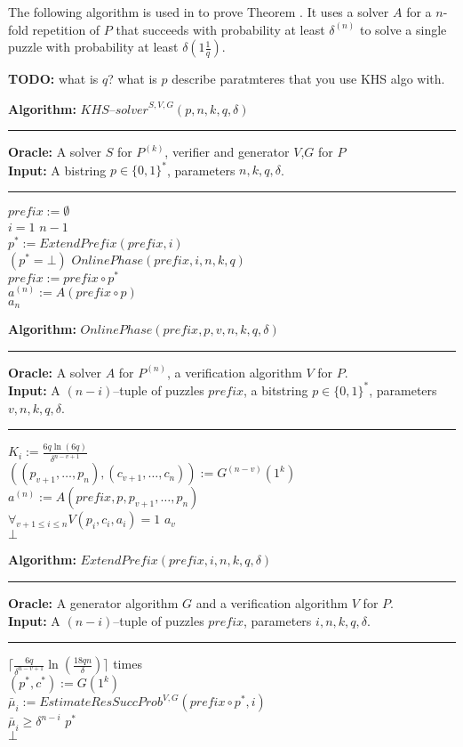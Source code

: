 \documentclass[11pt,a4paper,titlepage]{memoir}
\begin{document}
The following algorithm is used in \cite{canetti2004hardness} to prove Theorem \cite{th:wvp_chs}.
It uses a solver $A$ for a $n$-fold repetition of $P$ that succeeds with probability at least $\delta^{(n)}$
to solve a single puzzle with probability at least $\delta(1 \frac {1}{q})$.
%
\begin{todo}
  \textbf{TODO:} what is $q$? what is $p$ describe paratmteres that you use KHS algo with.
\end{todo}
%
\begin{codeblock}
  \textbf{Algorithm:} $\mathit{KHS\text{--}solver}^{S,V,G}(p, n, k, q, \delta)$
  \medskip\hrule
  \textbf{Oracle:} A solver $S$ for $P^{(k)}$, verifier and generator $V$,$G$ for $P$\\
  \textbf{Input:}  A bistring $p \in \{0,1\}^{*}$, parameters $n, k, q, \delta$.
  \medskip\hrule
  $\mathit{prefix} := \emptyset$\\
  \For $i = 1$ \To $n-1$ \Do \\
  \IndI $p^* := \mathit{ExtendPrefix(prefix, i)}$\\
  \IndI \If $(p^* = \bot)$ \Then \Return $\mathit{OnlinePhase}(prefix, i, n, k, q)$ \\
  \IndI \Else $prefix := prefix \circ p^*$\\
  $ a^{(n)} := A(prefix \circ p)$ \\
  \Return $a_n$
\end{codeblock}
%
\begin{codeblock}
  \textbf{Algorithm:} $\mathit{OnlinePhase(prefix, p, v, n, k, q, \delta)}$
  \medskip \hrule
  \textbf{Oracle:} A solver $A$ for $P^{(n)}$, a verification algorithm $V$ for $P$.\\
  \textbf{Input:} A $(n-i)$--tuple of puzzles $\mathit{prefix}$, a bitstring $p \in \{0,1\}^{*}$, parameters $v, n, k, q, \delta$.
  \medskip\hrule
  \Repeat $K_i := \frac{6q \ln (6q)}{\delta^{n-v+1}}$ \\
  \IndI $((p_{v+1}, \dotsc, p_{n}),(c_{v+1}, \dots, c_n)) := G^{(n-v)}(1^k)$\\
  \IndI $a^{(n)} := A(\mathit{prefix}, p, p_{v+1}, \dotsc, p_n)$\\
  \IndI \If $\forall_{v+1 \leq i \leq n} V(p_i, c_i, a_i) = 1$ \Then \Return $a_v$\\
  \Return $\bot$
\end{codeblock}
%
\begin{codeblock}
  \textbf{Algorithm:} $\mathit{ExtendPrefix(prefix, i, n, k, q, \delta)}$
  \medskip \hrule
  \textbf{Oracle:}  A generator algorithm $G$ and a verification algorithm $V$ for $P$.\\
  \textbf{Input:} A $(n-i)$--tuple of puzzles $\mathit{prefix}$, parameters $i, n, k, q, \delta$.
  \medskip\hrule
  \Repeat $\Big\lceil \frac{6q}{\delta^{n-v+1}} \ln (\frac{18qn}{\delta}) \Big\rceil$ times \Do \\
  \IndI $(p^*, c^*) := G(1^k) $\\
  \IndI $\bar{\mu}_i := \mathit{EstimateResSuccProb}^{V,G}(\mathit{prefix} \circ p^*, i)$\\
  \IndI \If $\bar{\mu}_i \geq \delta^{n-i}$ \Then \Return $p^*$ \\
  \Return $\bot$
\end{codeblock}
\end{document}
